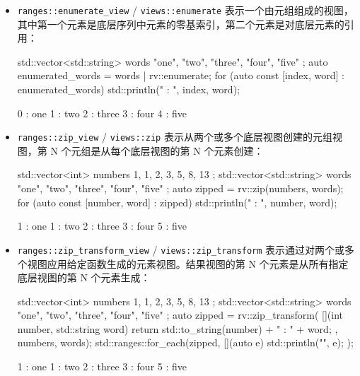 \begin{itemize}
\item
\verb|ranges::enumerate_view| / \verb|views::enumerate| 表示一个由元组组成的视图，其中第一个元素是底层序列中元素的零基索引，第二个元素是对底层元素的引用：

\begin{cpp}
std::vector<std::string> words{ "one", "two", "three",
                                "four", "five" };
auto enumerated_words = words | rv::enumerate;
for (auto const [index, word] : enumerated_words)
{
    std::println("{} : {}", index, word);
}
\end{cpp}

\begin{shell}
0 : one
1 : two
2 : three
3 : four
4 : five
\end{shell}

\item
\verb|ranges::zip_view| / \verb|views::zip| 表示从两个或多个底层视图创建的元组视图，第 N 个元组是从每个底层视图的第 N 个元素创建：

\begin{cpp}
std::vector<int> numbers{ 1, 1, 2, 3, 5, 8, 13 };
std::vector<std::string> words{ "one", "two", "three",
                                "four", "five" };
auto zipped = rv::zip(numbers, words);
for (auto const [number, word] : zipped)
{
    std::println("{} : {}", number, word);
}
\end{cpp}

\begin{shell}
1 : one
1 : two
2 : three
3 : four
5 : five
\end{shell}

\item
\verb|ranges::zip_transform_view| / \verb|views::zip_transform| 表示通过对两个或多个视图应用给定函数生成的元素视图。结果视图的第 N 个元素是从所有指定底层视图的第 N 个元素生成：

\begin{cpp}
std::vector<int> numbers{ 1, 1, 2, 3, 5, 8, 13 };
std::vector<std::string> words{ "one", "two", "three",
                                "four", "five" };
auto zipped = rv::zip_transform(
    [](int number, std::string word) {
        return std::to_string(number) + " : " + word;
    },
    numbers,
    words);
std::ranges::for_each(zipped,
                      [](auto e) {std::println("{}", e); });
\end{cpp}

\begin{shell}
1 : one
1 : two
2 : three
3 : four
5 : five
\end{shell}


\end{itemize}
